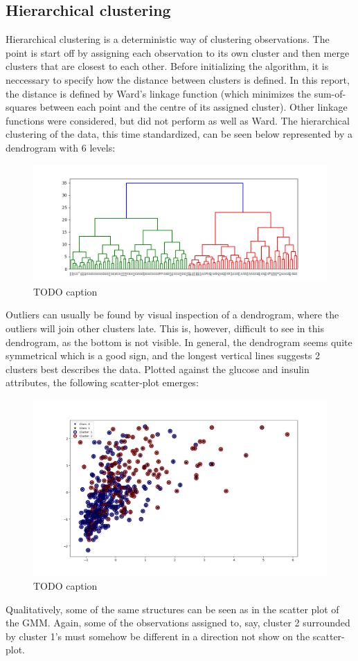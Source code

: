 \subsection{Hierarchical clustering}
Hierarchical clustering is a deterministic way of clustering observations. The
point is start off by assigning each observation to its own cluster and then
merge clusters that are closest to each other. Before initializing the algorithm,
it is neccessary to specify how the distance between clusters is defined. In this
report, the distance is defined by Ward's linkage function (which minimizes
the sum-of-squares between each point and the centre of its assigned cluster).
Other linkage functions were considered, but did not perform as well as Ward.
The hierarchical clustering of the data, this time standardized, can be seen
below represented by a dendrogram with 6 levels:\\
\begin{figure}[htb]
  \centering
  \includegraphics[width=\textwidth]{Figure_3.png}
  \caption{TODO caption}
\end{figure}
Outliers can usually be found by visual inspection of a dendrogram, where the
outliers will join other clusters late. This is, however, difficult to see in
this dendrogram, as the bottom is not visible. In general, the dendrogram seems
quite symmetrical which is a good sign, and the longest vertical lines suggests
2 clusters best describes the data. Plotted against the glucose and insulin attributes,
the following scatter-plot emerges:\\
\begin{figure}[htb]
  \centering
  \includegraphics[width=\textwidth]{Figure_4.png}
  \caption{TODO caption}
\end{figure}
Qualitatively, some of the same structures can be seen as in the scatter plot
of the GMM. Again, some of the observations assigned to, say, cluster 2
surrounded by cluster 1's must somehow be different in a direction not show
on the scatter-plot.

